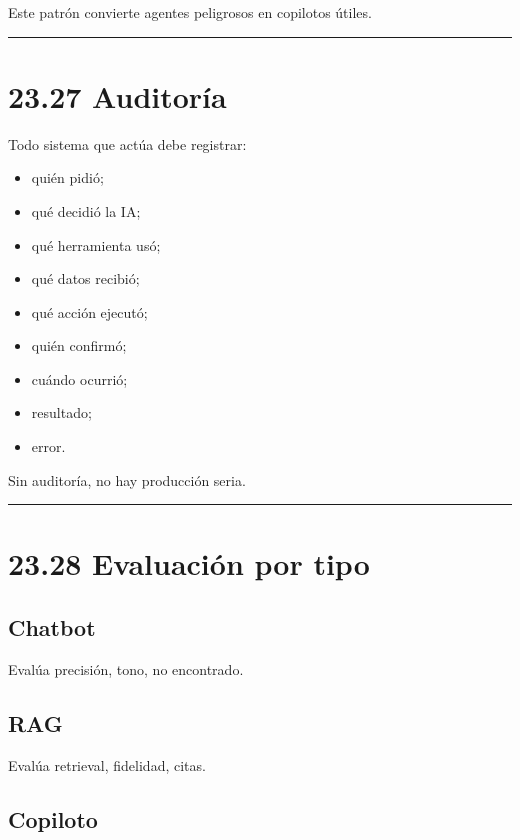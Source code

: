 Este patrón convierte agentes peligrosos en copilotos útiles.

\begin{center}\rule{0.5\linewidth}{0.5pt}\end{center}

\section{23.27 Auditoría}\label{auditoruxeda}

Todo sistema que actúa debe registrar:

\begin{itemize}
\tightlist
\item
  quién pidió;
\item
  qué decidió la IA;
\item
  qué herramienta usó;
\item
  qué datos recibió;
\item
  qué acción ejecutó;
\item
  quién confirmó;
\item
  cuándo ocurrió;
\item
  resultado;
\item
  error.
\end{itemize}

Sin auditoría, no hay producción seria.

\begin{center}\rule{0.5\linewidth}{0.5pt}\end{center}

\section{23.28 Evaluación por tipo}\label{evaluaciuxf3n-por-tipo}

\subsection{Chatbot}\label{chatbot-5}

Evalúa precisión, tono, no encontrado.

\subsection{RAG}\label{rag-2}

Evalúa retrieval, fidelidad, citas.

\subsection{Copiloto}\label{copiloto-4}

